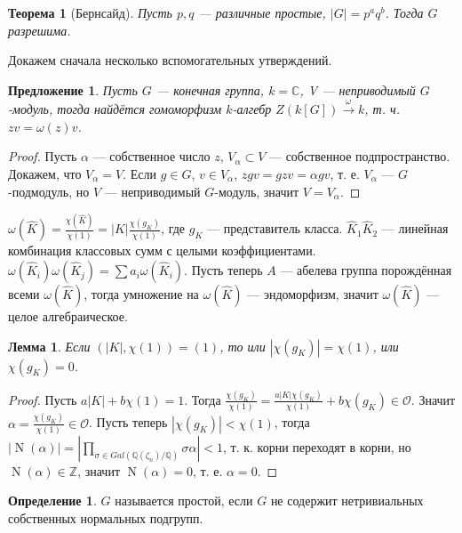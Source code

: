 \documentclass{article}
\newtheorem*{theorem}{Теорема}
\newtheorem*{lemma}{Лемма}
\newtheorem*{proposition}{Предложение}
\theoremstyle{definition}
\newtheorem*{definition}{Определение}
\theoremstyle{remark}
\DeclareMathOperator{\N}{N}
\newcommand{\Z}{\mathbb{Z}}
\newcommand{\Q}{\mathbb{Q}}
\renewcommand{\O}{\mathcal{O}}
\renewcommand{\C}{\mathbb{C}}
\begin{document}
\begin{theorem}[Бернсайд]
Пусть $p, q$ --- различные простые, $|G| = p^a q^b$. Тогда $G$ разрешима.
\end{theorem}
Докажем сначала несколько вспомогательных утверждений.

\begin{proposition}
	Пусть $G$ --- конечная группа, $k = \C$, V --- неприводимый $G$-модуль, тогда найдётся гомоморфизм $k$-алгебр $Z(k[G]) \xrightarrow{\omega} k$, т. ч. $zv = \omega(z)v$. 
\end{proposition}
\begin{proof}
	Пусть $\alpha$ --- собственное число $z$, $V_\alpha \subset V$ --- собственное подпространство. Докажем, что $V_\alpha = V$. Если $g \in G$, $v\in V_\alpha$, $zgv = gzv = \alpha gv$, т. е. $V_\alpha$ --- $G$-подмодуль, но $V$ --- неприводимый $G$-модуль, значит $V = V_\alpha$.
\end{proof}
$\omega(\hat{K}) = \frac{\chi(\hat{K})}{\chi(1)} = |K| \frac{\chi(g_K)}{\chi(1)}$, где $g_K$ --- представитель класса.
$\hat{K}_1\hat{K}_2$ --- линейная комбинация классовых сумм с целыми коэффициентами. $\omega(\hat{K}_i)\omega(\hat{K}_j) = \sum a_i \omega(\hat{K}_i)$. Пусть теперь $A$ --- абелева группа порождённая всеми $\omega(\hat{K})$, тогда умножение на $\omega(\hat{K})$ --- эндоморфизм, значит $\omega(\hat{K})$ --- целое алгебраическое.

\begin{lemma}
	Если $(|K|, \chi(1)) = (1)$, то или $|\chi(g_K)| = \chi(1)$, или $\chi(g_K) = 0$.
\end{lemma}
\begin{proof}
	Пусть $a|K| + b\chi(1) = 1$. Тогда $\frac{\chi(g_K)}{\chi(1)} = \frac{a|K| \chi(g_K)}{\chi(1)} + b\chi(g_K) \in \O$. Значит $\alpha = \frac{\chi(g_K)}{\chi(1)} \in \O$. Пусть теперь $|\chi(g_K)| < \chi(1)$, тогда $|\N(\alpha)| = |\prod\limits_{\sigma \in Gal(\Q(\zeta_n) / \Q)} \sigma\alpha| < 1$, т. к. корни переходят в корни, но $\N(\alpha) \in \Z$, значит $\N(\alpha) = 0$, т. е. $\alpha = 0$.
\end{proof}

\begin{definition}
$G$ называется простой, если $G$ не содержит нетривиальных собственных нормальных подгрупп.
\end{definition}
\end{document}
